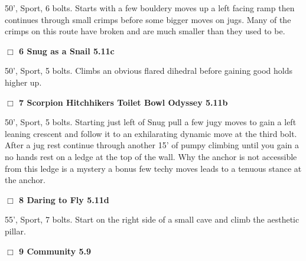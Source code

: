 \begin{multicols}{2}
\begin{adjustwidth}{1.3em}{}
50', Sport, 6 bolts. Starts with a few bouldery moves up a left facing ramp then continues through small crimps before some bigger moves on jugs. Many of the crimps on this route have broken and are much smaller than they used to be.
\end{adjustwidth}




\needspace{2em}
\label{rt:Snug as a Snail}
\colorbox{RoyalBlue!20}{
\parbox{0.95\linewidth}{
\hspace{-1ex}\textbf{$\Box$
6 Snug as a Snail 5.11c  
}}}
\begin{adjustwidth}{1.3em}{}			

50', Sport, 5 bolts. Climbs an obvious flared dihedral before gaining good holds higher up.
\end{adjustwidth}




\needspace{2em}
\label{rt:Scorpion Hitchhikers Toilet Bowl Odyssey}
\colorbox{RoyalBlue!20}{
\parbox{0.95\linewidth}{
\hspace{-1ex}\textbf{$\Box$
7 Scorpion Hitchhikers Toilet Bowl Odyssey 5.11b  
}}}
\begin{adjustwidth}{1.3em}{}			

50', Sport, 5 bolts. Starting just left of Snug pull a few jugy moves to gain a left leaning crescent and follow it to an exhilarating dynamic move at the third bolt. After a jug rest continue through another 15' of pumpy climbing until you gain a no hands rest on a ledge at the top of the wall. Why the anchor is not accessible from this ledge is a mystery a bonus few techy moves leads to a tenuous stance at the anchor.
\end{adjustwidth}




\needspace{2em}
\label{rt:Daring to Fly}
\colorbox{RoyalBlue!20}{
\parbox{0.95\linewidth}{
\hspace{-1ex}\textbf{$\Box$
8 Daring to Fly 5.11d  
}}}
\begin{adjustwidth}{1.3em}{}			

55', Sport, 7 bolts. Start on the right side of a small cave and climb the aesthetic pillar.
\end{adjustwidth}




\needspace{2em}
\label{rt:Community}
\colorbox{green!20}{
\parbox{0.95\linewidth}{
\hspace{-1ex}\textbf{$\Box$
9 Community 5.9  
}}}
\begin{adjustwidth}{1.3em}{}			


\end{adjustwidth}
\end{multicols}
